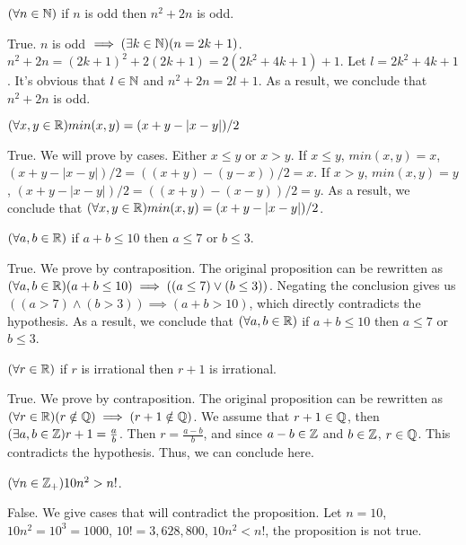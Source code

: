 \documentclass[11pt]{article}
\begin{document}
\newpage
{}

\begin{Parts}
	
	\Part $(\forall n \in \mathbb{N})$ if $n$ is odd then $n^2+2n$ is odd.

	\begin{Answer}
		True. $n$ is odd $\implies (\exists k \in \mathbb{N})(n = 2k + 1)$. $n^2 + 2n = (2k + 1)^2 + 2(2k + 1)
		= 2(2k^2 + 4k + 1) + 1$. Let $l = 2k^2 + 4k + 1$. It's obvious that $l \in \mathbb{N}$ and $n^2 + 2n = 
		2l + 1$. As a result, we conclude that $n^2 + 2n$ is odd. 
	\end{Answer}

	\Part $(\forall x,y \in \mathbb{R}) min(x,y) = (x + y - |x - y|) / 2$

	\begin{Answer}
		True. We will prove by cases. Either $x \leq y$ or $x > y$. If $x \leq y$, $min(x,y)=x$, $(x + y
		 - |x - y|) / 2 = ((x+y)-(y-x))/2 = x$. If $x > y$, $min(x,y)=y$, $(x+y-|x-y|)/2 = ((x+y)-(x-y))/2
		  = y$. As a result, we conclude that $(\forall x,y \in \mathbb{R}) min(x,y) = (x + y - |x - y|) / 2$. 
	\end{Answer}

	\Part $(\forall a,b \in \mathbb{R})$ if $a+b \leq 10$ then $a \leq 7$ or $b \leq 3$.

	\begin{Answer}
		True. We prove by contraposition. The original proposition can be rewritten as $(\forall a,b \in \mathbb{R})
		(a+b \leq 10) \implies ((a \leq 7) \lor (b \leq 3))$. Negating the conclusion gives us $((a > 7) \land
		(b > 3)) \implies (a + b > 10)$, which directly contradicts the hypothesis. As a result, we conclude 
		that $(\forall a,b \in \mathbb{R})$ if $a+b \leq 10$ then $a \leq 7$ or $b \leq 3$.
	\end{Answer}

	\Part $(\forall r \in \mathbb{R})$ if $r$ is irrational then $r + 1$ is irrational.

	\begin{Answer}
		True. We prove by contraposition. The original proposition can be rewritten as $(\forall r \in \mathbb{R})
		(r \notin \mathbb{Q}) \implies (r + 1 \notin \mathbb{Q})$. We assume that $r + 1 \in \mathbb{Q}$, then $(\exists a,b \in \mathbb{Z})
		r+1=\frac{a}{b}$. Then $r=\frac{a-b}{b}$, and since $a-b \in \mathbb{Z}$ and $b \in \mathbb{Z}$, $r \in \mathbb{Q}$. This 
		contradicts the hypothesis. Thus, we can conclude here. 
	\end{Answer}

	\Part $(\forall n \in \mathbb{Z}_+) 10n^2 > n!$.

	\begin{Answer}
		False. We give cases that will contradict the proposition. Let $n = 10$, $10n^2 = 10^3 = 1000$, 
		$10! = 3,628,800$, $10n^2 < n!$, the proposition is not true. 
	\end{Answer}

\end{Parts}
\end{document}
